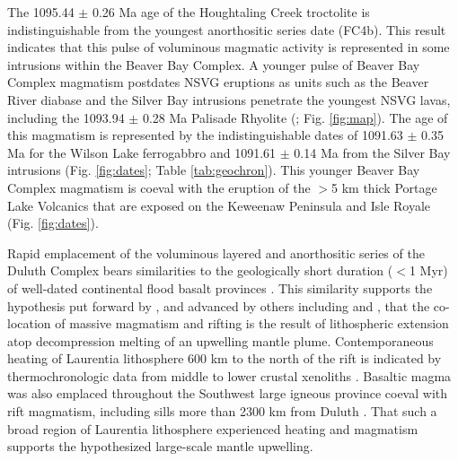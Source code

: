 \documentclass[11pt,letterpaper]{article}
\begin{document}
The 1095.44 $\pm$ 0.26 Ma age of the Houghtaling Creek troctolite is indistinguishable from the youngest anorthositic series date (FC4b). This result indicates that this pulse of voluminous magmatic activity is represented in some intrusions within the Beaver Bay Complex. A younger pulse of Beaver Bay Complex magmatism postdates NSVG eruptions as units such as the Beaver River diabase and the Silver Bay intrusions penetrate the youngest NSVG lavas, including the 1093.94 $\pm$ 0.28 Ma Palisade Rhyolite (\citealp{Miller2001a, Swanson-Hysell2019a}; Fig. \ref{fig:map}). The age of this magmatism is represented by the indistinguishable dates of 1091.63 $\pm$ 0.35 Ma for the Wilson Lake ferrogabbro and 1091.61 $\pm$ 0.14 Ma from the Silver Bay intrusions (Fig. \ref{fig:dates}; Table \ref{tab:geochron}). This younger Beaver Bay Complex magmatism is coeval with the eruption of the $>$5 km thick Portage Lake Volcanics that are exposed on the Keweenaw Peninsula and Isle Royale (Fig. \ref{fig:dates}).

Rapid emplacement of the voluminous layered and anorthositic series of the Duluth Complex bears similarities to the geologically short duration ($<$1 Myr) of well-dated continental flood basalt provinces \citep{Burgess2015a, Schoene2019a}. This similarity supports the hypothesis put forward by \cite{Green1983a}, and advanced by others including \cite{Cannon1992a} and \cite{Stein2015a}, that the co-location of massive magmatism and rifting is the result of lithospheric extension atop decompression melting of an upwelling mantle plume. Contemporaneous heating of Laurentia lithosphere 600 km to the north of the rift is indicated by thermochronologic data from middle to lower crustal xenoliths \citep{Edwards2018a}. Basaltic magma was also emplaced throughout the Southwest large igneous province coeval with rift magmatism, including sills more than 2300 km from Duluth \citep{Bright2014a}. That such a broad region of Laurentia lithosphere experienced heating and magmatism supports the hypothesized large-scale mantle upwelling.

\end{document}
